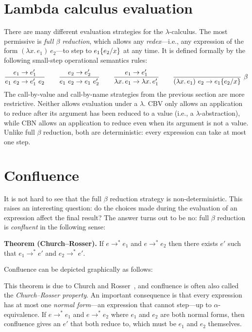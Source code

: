 \section{Lambda calculus evaluation}

There are many different evaluation strategies for the $\lambda$-calculus. The most permissive is
\emph{full $\beta$ reduction}, which allows any \emph{redex}---i.e., any expression of the form
$(\lambda x.\,e_1)\ e_2$---to step to $e_1\{e_2/x\}$ at any time. It is defined formally by
the following small-step operational semantics rules:
\[
  \rul{e_1\to e_1'}{e_1\ e_2\to e_1'\ e_2}
  \qquad
  \rul{e_2\to e_2'}{e_1\ e_2\to e_1\ e_2'}
  \qquad
  \rul{e_1\to e_1'}{\lambda x.\,e_1\to\lambda x.\,e_1'}
  \qquad
  \infr{}{(\lambda x.\,e_1)\ e_2\to\sub{e_1}{e_2}{x}}{$\beta$}
\]
The call-by-value and call-by-name strategies from the previous section are more restrictive.
Neither allows evaluation under a $\lambda$. CBV only allows an application to reduce after its
argument has been reduced to a value (i.e., a $\lambda$-abstraction), while CBN allows an
application to reduce even when its argument is not a value. Unlike full $\beta$ reduction, both
are deterministic: every expression can take at most one step.

\section{Confluence}

It is not hard to see that the full $\beta$ reduction strategy is non-deterministic. This raises an
interesting question: do the choices made during the evaluation of an expression affect the final
result? The answer turns out to be no: full $\beta$ reduction is \emph{confluent} in the following
sense:

\medskip
\noindent\textbf{Theorem (Church--Rosser).} If $e\to^* e_1$ and $e\to^* e_2$ then there exists
$e'$ such that $e_1\to^* e'$ and $e_2\to^* e'$.

\medskip
Confluence can be depicted graphically as follows:
\begin{center}
\end{center}
This theorem is due to Church and Rosser~\cite{church-rosser}, and confluence is often also called
the \emph{Church--Rosser property}. An important consequence is that every expression has at most
one \emph{normal form}---an expression that cannot step---up to $\alpha$-equivalence. If
$e\to^* e_1$ and $e\to^* e_2$ where $e_1$ and $e_2$ are both normal forms, then confluence gives an
$e'$ that both reduce to, which must be $e_1$ and $e_2$ themselves.

